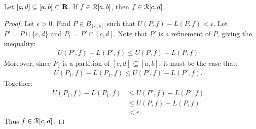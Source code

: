 \documentclass[11pt,twoside,openany]{memoir}
\begin{document}
    \begin{lemma}\label{lemma:1}
        Let $[c,d] \subseteq [a,b] \subset \mathbf{R}$. If $f \in \mathcal{R}[a,b]$, then $f \in \mathcal{R}[c,d]$.
    \end{lemma}
        \begin{proof}
            Let $\epsilon > 0$. Find $P \in B_{[a,b]}$ such that $U(P,f) - L(P,f) < \epsilon$. Let $P' = P \cup \{c,d\}$ and $P_1 = P' \cap [c,d]$. Note that $P'$ is a refinement of $P$, giving the inequality:
                \begin{equation*}
                \begin{split}
                    U(P',f) - L(P',f) \leq U(P,f) - L(P,f)
                \end{split}
                \end{equation*}
            Moreover, since $P_1$ is a partition of $[c,d] \subseteq [a,b]$, it must be the case that:
                \begin{equation*}
                \begin{split}
                    U(P_1,f) - L(P_1,f) \leq U(P',f) - L(P',f).
                \end{split}
                \end{equation*}
            Together:
                \begin{equation*}
                \begin{split}
                    U(P_1,f) - L(P_1,f)
                    & \leq U(P',f) - L(P',f) \\
                    & \leq U(P,f) - L(P,f) \\
                    & < \epsilon.
                \end{split}
                \end{equation*}
            Thus $f \in \mathcal{R}[c,d]$.
            \end{proof}
\end{document}
